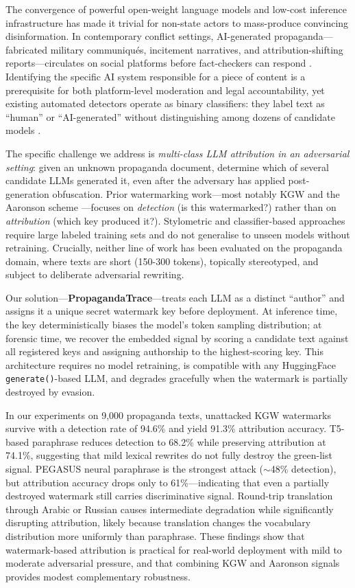 \documentclass[11pt]{article}
\begin{document}
The convergence of powerful open-weight language models and low-cost inference
infrastructure has made it trivial for non-state actors to mass-produce
convincing disinformation.
In contemporary conflict settings, AI-generated propaganda---fabricated
military communiqués, incitement narratives, and attribution-shifting
reports---circulates on social platforms before fact-checkers can respond
\cite{zellers2019grover}.
Identifying the specific AI system responsible for a piece of content is a
prerequisite for both platform-level moderation and legal accountability, yet
existing automated detectors operate as binary classifiers: they label text
as ``human'' or ``AI-generated'' without distinguishing among dozens of
candidate models \cite{sadasivan2023aigenerated,guo2023hcx}.

The specific challenge we address is \emph{multi-class LLM attribution in an
adversarial setting}: given an unknown propaganda document, determine which
of several candidate LLMs generated it, even after the adversary has applied
post-generation obfuscation.
Prior watermarking work---most notably KGW \cite{kirchenbauer2023watermark}
and the Aaronson scheme \cite{aaronson2022watermark}---focuses on
\emph{detection} (is this watermarked?) rather than on
\emph{attribution} (which key produced it?).
Stylometric and classifier-based approaches
\cite{uchendu2020authorship,ippolito2020automatic} require large labeled
training sets and do not generalise to unseen models without retraining.
Crucially, neither line of work has been evaluated on the propaganda domain,
where texts are short (150-300 tokens), topically stereotyped, and subject to
deliberate adversarial rewriting.

Our solution---\textbf{PropagandaTrace}---treats each LLM as a distinct
``author'' and assigns it a unique secret watermark key before deployment.
At inference time, the key deterministically biases the model's token
sampling distribution; at forensic time, we recover the embedded signal by
scoring a candidate text against all registered keys and assigning authorship
to the highest-scoring key.
This architecture requires no model retraining, is compatible with any
HuggingFace \texttt{generate()}-based LLM, and degrades gracefully when
the watermark is partially destroyed by evasion.

In our experiments on 9{,}000 propaganda texts, unattacked KGW watermarks
survive with a detection rate of 94.6\% and yield 91.3\% attribution accuracy.
T5-based paraphrase reduces detection to 68.2\% while preserving attribution
at 74.1\%, suggesting that mild lexical rewrites do not fully destroy the
green-list signal.
PEGASUS neural paraphrase is the strongest attack ($\sim$48\% detection),
but attribution accuracy drops only to 61\%---indicating that even a
partially destroyed watermark still carries discriminative signal.
Round-trip translation through Arabic or Russian causes intermediate
degradation while significantly disrupting attribution, likely because
translation changes the vocabulary distribution more uniformly than paraphrase.
These findings show that watermark-based attribution is practical for
real-world deployment with mild to moderate adversarial pressure, and that
combining KGW and Aaronson signals provides modest complementary robustness.
\end{document}

